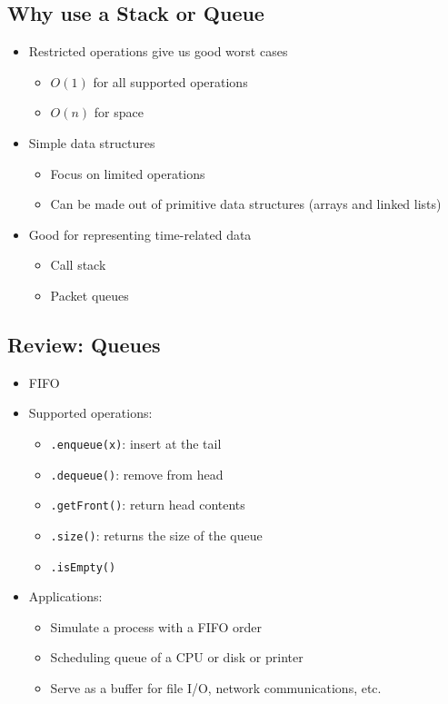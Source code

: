 \documentclass[10pt]{article}
\begin{document}
\subsection*{Why use a Stack or Queue}
\begin{itemize}
    \item Restricted operations give us good worst cases
    \begin{itemize}
        \item $O(1)$ for all supported operations
        \item $O(n)$ for space
    \end{itemize}
    \item Simple data structures
    \begin{itemize}
        \item Focus on limited operations
        \item Can be made out of primitive data structures (arrays and linked lists)
    \end{itemize}
    \item Good for representing time-related data
    \begin{itemize}
        \item Call stack
        \item Packet queues
    \end{itemize}
\end{itemize}

\subsection*{Review: Queues}
\begin{itemize}
    \item FIFO
    \item Supported operations:
    \begin{itemize}
        \item \texttt{.enqueue(x)}: insert at the tail
        \item \texttt{.dequeue()}: remove from head
        \item \texttt{.getFront()}: return head contents
        \item \texttt{.size()}: returns the size of the queue
        \item \texttt{.isEmpty()}
    \end{itemize}
    \item Applications:
    \begin{itemize}
        \item Simulate a process with a FIFO order
        \item Scheduling queue of a CPU or disk or printer
        \item Serve as a buffer for file I/O, network communications, etc.
    \end{itemize}
\end{itemize}
\end{document}
